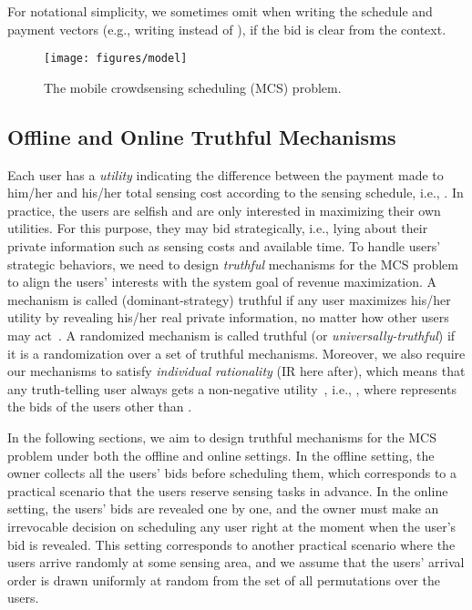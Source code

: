 \documentclass[10pt,journal,compsoc]{IEEEtran}
\begin{document}
    For notational simplicity, we sometimes omit  when writing the schedule and payment vectors (e.g., writing  instead of ), if the bid  is clear from the context.
\begin{figure}[htb]
      \centering
      \texttt{[image: figures/model]}
      \caption{The mobile crowdsensing scheduling (MCS) problem.} \label{fig:mcsmodel}
\end{figure}

  \subsection{Offline and Online Truthful Mechanisms}
Each user  has a \textit{utility} indicating the difference between the payment made to him/her and his/her total sensing cost according to the sensing schedule, i.e., . In practice, the users are selfish and are only interested in maximizing their own utilities. For this purpose, they may bid strategically, i.e., lying about their private information such as sensing costs and available time. To handle users' strategic behaviors, we need to design \textit{truthful} mechanisms for the MCS problem to align the users' interests with the system goal of revenue maximization. A mechanism is called (dominant-strategy) truthful if any user maximizes his/her utility by revealing his/her real private information, no matter how other users may act~\cite{Nisan2007}. A randomized mechanism is called truthful (or \textit{universally-truthful}) if it is a randomization over a set of truthful mechanisms. Moreover, we also require our mechanisms to satisfy \textit{individual rationality} (IR here after), which means that any truth-telling user  always gets a non-negative utility~\cite{Nisan2007}, i.e., , where  represents the bids of the users other than .


    In the following sections, we aim to design truthful mechanisms for the MCS problem under both the offline and online settings. In the offline setting, the owner collects all the users' bids before scheduling them, which corresponds to a practical scenario that the users reserve sensing tasks in advance. In the online setting, the users' bids are revealed one by one, and the owner must make an irrevocable decision on scheduling any user right at the moment when the user's bid is revealed. This setting corresponds to another practical scenario where the users arrive randomly at some sensing area, and we assume that the users' arrival order is drawn uniformly at random from the set of all permutations over the users.
\end{document}
